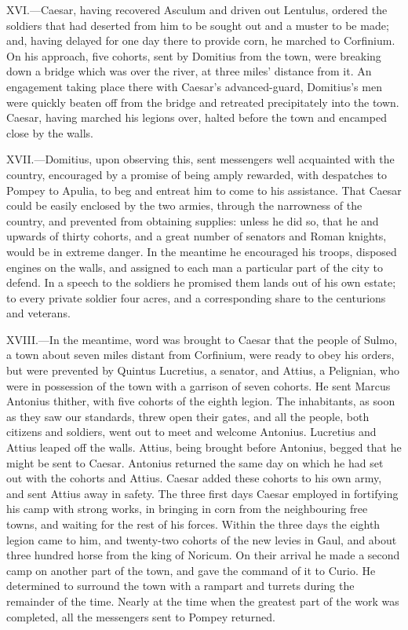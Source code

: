 XVI.—Caesar, having recovered Asculum and driven out Lentulus, ordered
the soldiers that had deserted from him to be sought out and a muster to
be made; and, having delayed for one day there to provide corn, he
marched to Corfinium. On his approach, five cohorts, sent by Domitius
from the town, were breaking down a bridge which was over the river, at
three miles' distance from it. An engagement taking place there with
Caesar's advanced-guard, Domitius's men were quickly beaten off from the
bridge and retreated precipitately into the town. Caesar, having marched
his legions over, halted before the town and encamped close by the
walls.

XVII.—Domitius, upon observing this, sent messengers well acquainted
with the country, encouraged by a promise of being amply rewarded, with
despatches to Pompey to Apulia, to beg and entreat him to come to his
assistance. That Caesar could be easily enclosed by the two armies,
through the narrowness of the country, and prevented from obtaining
supplies: unless he did so, that he and upwards of thirty cohorts, and a
great number of senators and Roman knights, would be in extreme danger.
In the meantime he encouraged his troops, disposed engines on the walls,
and assigned to each man a particular part of the city to defend. In a
speech to the soldiers he promised them lands out of his own estate; to
every private soldier four acres, and a corresponding share to the
centurions and veterans.

XVIII.—In the meantime, word was brought to Caesar that the people of
Sulmo, a town about seven miles distant from Corfinium, were ready to
obey his orders, but were prevented by Quintus Lucretius, a senator, and
Attius, a Pelignian, who were in possession of the town with a garrison
of seven cohorts. He sent Marcus Antonius thither, with five cohorts of
the eighth legion. The inhabitants, as soon as they saw our standards,
threw open their gates, and all the people, both citizens and soldiers,
went out to meet and welcome Antonius. Lucretius and Attius leaped off
the walls. Attius, being brought before Antonius, begged that he might
be sent to Caesar. Antonius returned the same day on which he had set
out with the cohorts and Attius. Caesar added these cohorts to his own
army, and sent Attius away in safety. The three first days Caesar
employed in fortifying his camp with strong works, in bringing in corn
from the neighbouring free towns, and waiting for the rest of his
forces. Within the three days the eighth legion came to him, and
twenty-two cohorts of the new levies in Gaul, and about three hundred
horse from the king of Noricum. On their arrival he made a second camp
on another part of the town, and gave the command of it to Curio. He
determined to surround the town with a rampart and turrets during the
remainder of the time. Nearly at the time when the greatest part of the
work was completed, all the messengers sent to Pompey returned.

